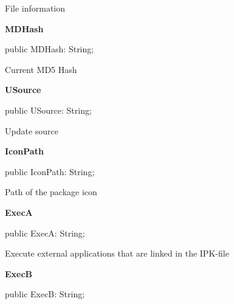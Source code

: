 \documentclass{report}
\newif\ifpdf
\begin{document}
\begin{list}{}
\begin{flushleft}
\ifpdf
\end{flushleft}
\fi


\par File information\label{mainunit.TIWizFrm-MDHash}
\item[\textbf{MDHash}\hfill]
\ifpdf
\begin{flushleft}
\fi
\begin{ttfamily}
public MDHash: String;\end{ttfamily}

\ifpdf
\end{flushleft}
\fi


\par Current MD5 Hash\label{mainunit.TIWizFrm-USource}
\item[\textbf{USource}\hfill]
\ifpdf
\begin{flushleft}
\fi
\begin{ttfamily}
public USource: String;\end{ttfamily}

\ifpdf
\end{flushleft}
\fi


\par Update source\label{mainunit.TIWizFrm-IconPath}
\item[\textbf{IconPath}\hfill]
\ifpdf
\begin{flushleft}
\fi
\begin{ttfamily}
public IconPath: String;\end{ttfamily}

\ifpdf
\end{flushleft}
\fi


\par Path of the package icon\label{mainunit.TIWizFrm-ExecA}
\item[\textbf{ExecA}\hfill]
\ifpdf
\begin{flushleft}
\fi
\begin{ttfamily}
public ExecA: String;\end{ttfamily}

\ifpdf
\end{flushleft}
\fi


\par Execute external applications that are linked in the IPK{-}file\label{mainunit.TIWizFrm-ExecB}
\item[\textbf{ExecB}\hfill]
\ifpdf
\begin{flushleft}
\fi
\begin{ttfamily}
public ExecB: String;\end{ttfamily}


\end{flushleft}
\end{list}
\end{document}
